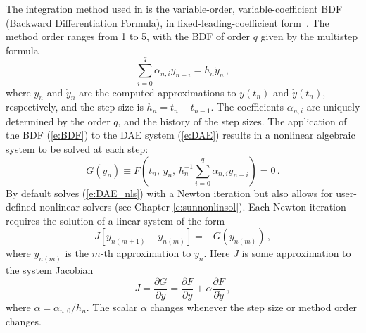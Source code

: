 The integration method used in {\ida} is the variable-order, variable-coefficient
BDF (Backward Differentiation Formula), in fixed-leading-coefficient
form~\cite{BCP:96}.
The method order ranges from 1 to 5, with the BDF of order $q$
given by the multistep formula
\begin{equation}\label{e:BDF}
  \sum_{i=0}^q \alpha_{n,i}y_{n-i} = h_n \dot{y}_n \, ,
\end{equation}
where $y_n$ and $\dot{y}_n$ are the computed approximations to $y(t_n)$
and $\dot{y}(t_n)$, respectively, and the step size is $h_n = t_n - t_{n-1}$.  
The coefficients $\alpha_{n,i}$ are uniquely determined by the order
$q$, and the history of the step sizes.  The application of the BDF
(\ref{e:BDF}) to the DAE system (\ref{e:DAE}) results in a nonlinear
algebraic system to be solved at each step:
\begin{equation}\label{e:DAE_nls}
  G(y_n) \equiv 
  F \left( t_n , \, y_n , \, 
    h_n^{-1} \sum_{i=0}^q \alpha_{n,i}y_{n-i} \right) = 0 \, .
\end{equation}
%
By default {\ida} solves (\ref{e:DAE_nls}) with a Newton iteration but {\ida}
also allows for user-defined nonlinear solvers (see Chapter
\ref{c:sunnonlinsol}). Each Newton iteration requires the solution of a linear
system of the form
\begin{equation}\label{e:DAE_Newtoncorr}
  J [y_{n(m+1)} - y_{n(m)}] = -G(y_{n(m)})  \, , 
\end{equation}
where $y_{n(m)}$ is the $m$-th approximation to $y_n$. 
%
Here $J$ is some approximation to the system Jacobian
\begin{equation}\label{e:DAE_Jacobian}
  J = \frac{\partial G}{\partial y}
  = \frac{\partial F}{\partial y} + 
  \alpha\frac{\partial F}{\partial \dot{y}} \, ,
\end{equation}
where $\alpha = \alpha_{n,0}/h_n$. The scalar $\alpha$ changes 
whenever the step size or method order changes.

